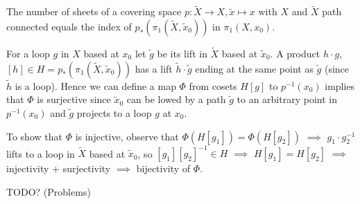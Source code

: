 \documentclass[12pt]{article}					%
\begin{document}
\begin{tvrzeni}
	The number of sheets of a covering space $p: \tilde X \rightarrow X, \tilde x \mapsto x$ with $X$ and $\tilde X$ path connected equals the index of $p_*(π_1(\tilde X, \tilde x_0))$ in $π_1(X, x_0)$.

	\begin{dukazin}
		For a loop $g$ in $X$ based at $x_0$ let $\tilde g$ be its lift in $\tilde X$ based at $\tilde x_0$. A product $h·g$, $[h] \in H = p_*(π_1(\tilde X, \tilde x_0))$ has a lift $\tilde h·\tilde g$ ending at the same point as $\tilde g$ (since $\tilde h$ is a loop). Hence we can define a map $Φ$ from cosets $H[g]$ to $p^{-1}(x_0)$ implies that $Φ$ is surjective since $\tilde x_0$ can be lowed by a path $\tilde g$ to an arbitrary point in $p^{-1}(x_0)$ and $\tilde g$ projects to a loop $g$ at $x_0$.

		To show that $Φ$ is injective, observe that $Φ(H[g_1]) = Φ(H[g_2])$ $\implies$ $g_1·g_2^{-1}$ lifts to a loop in $\tilde X$ based at $\tilde x_0$, so $[g_1][g_2]^{-1} \in H$ $\implies$ $H[g_1] = H[g_2]$ $\implies$ injectivity + surjectivity $\implies$ bijectivity of $Φ$.
	\end{dukazin}
\end{tvrzeni}


TODO? (Problems)
\end{document}
